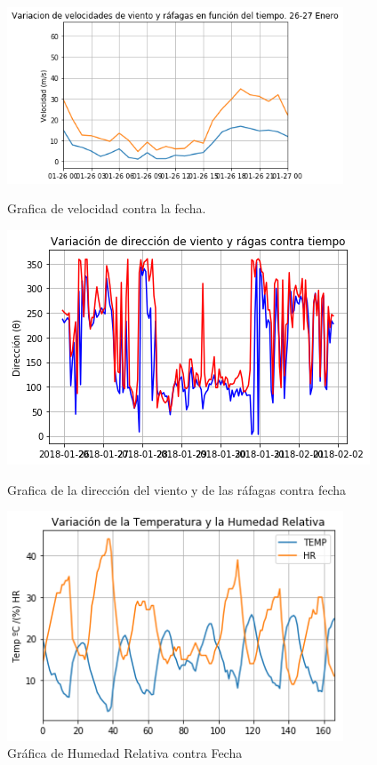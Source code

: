 \documentclass{article}
\begin{document}
    \begin{figure}

    \includegraphics[width=10cm]{Velocidades contra Fecha.png}
    \caption{Grafica de velocidad contra la fecha.}


    \includegraphics[width=\linewidth]{Direcciones contra Fecha.png}
    \caption{Grafica de la dirección del viento y de las ráfagas contra fecha}

    \includegraphics[width=10cm]{HR contra Temp.png}
    \caption{Gráfica de Humedad Relativa contra Fecha}
    
    \end{figure}
    
\end{document}
